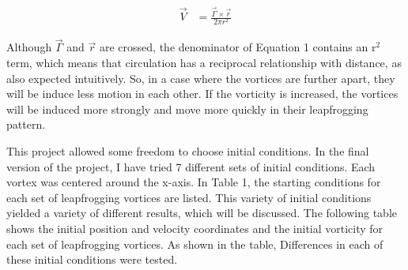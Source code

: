 \documentclass{article}
\begin{document}
\begin{equation} \label{eq:1}
    \begin{aligned}
        \vec{V} &= \frac{\vec{\Gamma} \times \vec{r}}{2 \pi r^2}
    \end{aligned}
\end{equation}

Although $\vec{\Gamma}$ and $\vec{r}$ are crossed, the denominator of Equation 1 contains an r$^2$ term, which means that circulation has a reciprocal relationship with distance, as also expected intuitively. So, in a case where the vortices are further apart, they will be induce less motion in each other. If the vorticity is increased, the vortices will be induced more strongly and move more quickly in their leapfrogging pattern. \newline

This project allowed some freedom to choose initial conditions. In the final version of the project, I have tried 7 different sets of initial conditions. Each vortex was centered around the x-axis. In Table 1, the starting conditions for each set of leapfrogging vortices are listed. This variety of initial conditions yielded a variety of different results, which will be discussed. The following table shows the initial position and velocity coordinates and the initial vorticity for each set of leapfrogging vortices. As shown in the table, Differences in each of these initial conditions were tested. \newline
\end{document}
